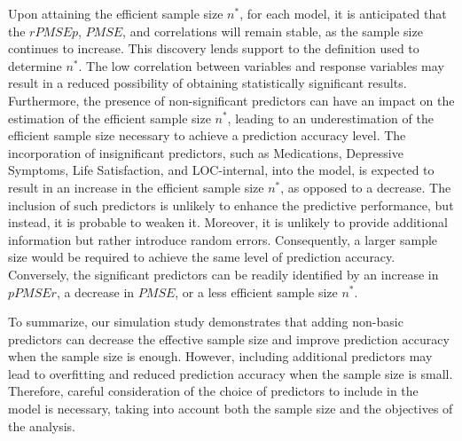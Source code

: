 Upon attaining the efficient sample size $n^*$, for each model, it is anticipated that the $rPMSEp$, $PMSE$, and correlations will remain stable, as the sample size continues to increase. This discovery lends support to the definition used to determine $n^*$. The low correlation between variables and response variables may result in a reduced possibility of obtaining statistically significant results. Furthermore, the presence of non-significant predictors can have an impact on the estimation of the efficient sample size $n^*$, leading to an underestimation of the efficient sample size necessary to achieve a prediction accuracy level. The incorporation of insignificant predictors, such as Medications, Depressive Symptoms, Life Satisfaction, and LOC-internal, into the model, is expected to result in an increase in the efficient sample size $n^*$, as opposed to a decrease. The inclusion of such predictors is unlikely to enhance the predictive performance, but instead, it is probable to weaken it. Moreover, it is unlikely to provide additional information but rather introduce random errors. Consequently, a larger sample size would be required to achieve the same level of prediction accuracy. Conversely, the significant predictors can be readily identified by an increase in $pPMSEr$, a decrease in $PMSE$, or a less efficient sample size $n^*$.

To summarize, our simulation study demonstrates that adding non-basic predictors can decrease the effective sample size and improve prediction accuracy when the sample size is enough. However, including additional predictors may lead to overfitting and reduced prediction accuracy when the sample size is small. Therefore, careful consideration of the choice of predictors to include in the model is necessary, taking into account both the sample size and the objectives of the analysis.





